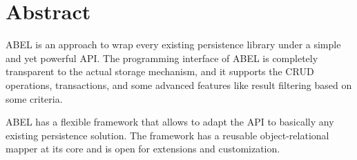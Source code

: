\section*{Abstract}

ABEL is an approach to wrap every existing persistence library under a simple and yet powerful API.
The programming interface of ABEL is completely transparent to the actual storage mechanism, and it supports the CRUD operations, transactions, and some advanced features like result filtering based on some criteria.

ABEL has a flexible framework that allows to adapt the API to basically any existing persistence solution.
The framework has a reusable object-relational mapper at its core and is open for extensions and customization.